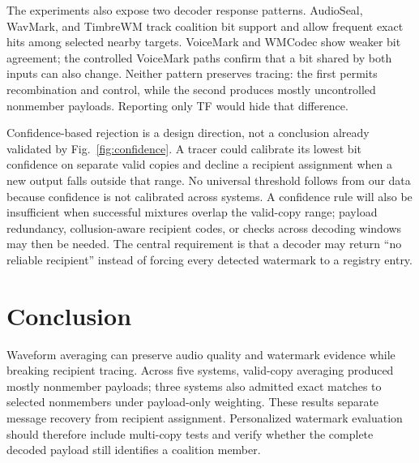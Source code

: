 \documentclass{article}
\begin{document}
The experiments also expose two decoder response patterns. AudioSeal, WavMark, and TimbreWM track coalition bit support and allow frequent exact hits among selected nearby targets. VoiceMark and WMCodec show weaker bit agreement; the controlled VoiceMark paths confirm that a bit shared by both inputs can also change. Neither pattern preserves tracing: the first permits recombination and control, while the second produces mostly uncontrolled nonmember payloads. Reporting only TF would hide that difference.

Confidence-based rejection is a design direction, not a conclusion already validated by Fig.~\ref{fig:confidence}. A tracer could calibrate its lowest bit confidence on separate valid copies and decline a recipient assignment when a new output falls outside that range. No universal threshold follows from our data because confidence is not calibrated across systems. A confidence rule will also be insufficient when successful mixtures overlap the valid-copy range; payload redundancy, collusion-aware recipient codes, or checks across decoding windows may then be needed. The central requirement is that a decoder may return ``no reliable recipient'' instead of forcing every detected watermark to a registry entry.

\section{Conclusion}
\label{sec:conclusion}

Waveform averaging can preserve audio quality and watermark evidence while breaking recipient tracing. Across five systems, valid-copy averaging produced mostly nonmember payloads; three systems also admitted exact matches to selected nonmembers under payload-only weighting. These results separate message recovery from recipient assignment. Personalized watermark evaluation should therefore include multi-copy tests and verify whether the complete decoded payload still identifies a coalition member.



\end{document}
